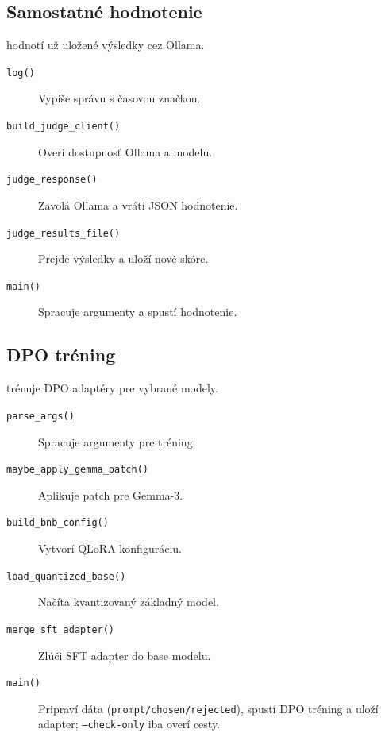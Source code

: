 \subsection{Samostatné hodnotenie}

\textbf{} hodnotí už uložené výsledky cez Ollama.
\begin{description}
	\item[\texttt{log()}] Vypíše správu s časovou značkou.
	\item[\texttt{build\_judge\_client()}] Overí dostupnosť Ollama a modelu.
	\item[\texttt{judge\_response()}] Zavolá Ollama a vráti JSON hodnotenie.
	\item[\texttt{judge\_results\_file()}] Prejde výsledky a uloží nové skóre.
	\item[\texttt{main()}] Spracuje argumenty a spustí hodnotenie.
\end{description}

\subsection{DPO tréning}

\textbf{} trénuje DPO adaptéry pre vybrané modely.
\begin{description}
	\item[\texttt{parse\_args()}] Spracuje argumenty pre tréning.
	\item[\texttt{maybe\_apply\_gemma\_patch()}] Aplikuje patch pre Gemma-3.
	\item[\texttt{build\_bnb\_config()}] Vytvorí QLoRA konfiguráciu.
	\item[\texttt{load\_quantized\_base()}] Načíta kvantizovaný základný model.
	\item[\texttt{merge\_sft\_adapter()}] Zlúči SFT adapter do base modelu.
	\item[\texttt{main()}] Pripraví dáta (\texttt{prompt/chosen/rejected}), spustí DPO tréning a uloží adapter; \texttt{--check-only} iba overí cesty.
\end{description}
